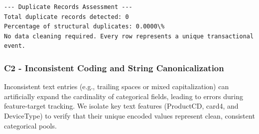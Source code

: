 \documentclass[11pt]{article}
\begin{document}
    \begin{Verbatim}[commandchars=\\\{\}]
--- Duplicate Records Assessment ---
Total duplicate records detected: 0
Percentage of structural duplicates: 0.0000\%
No data cleaning required. Every row represents a unique transactional event.
    \end{Verbatim}

    \subsubsection{C2 - Inconsistent Coding and String
Canonicalization}\label{c2---inconsistent-coding-and-string-canonicalization}

    Inconsistent text entries (e.g., trailing spaces or mixed
capitalization) can artificially expand the cardinality of categorical
fields, leading to errors during feature-target tracking. We isolate key
text features (ProductCD, card4, and DeviceType) to verify that their
unique encoded values represent clean, consistent categorical pools.
\end{document}
